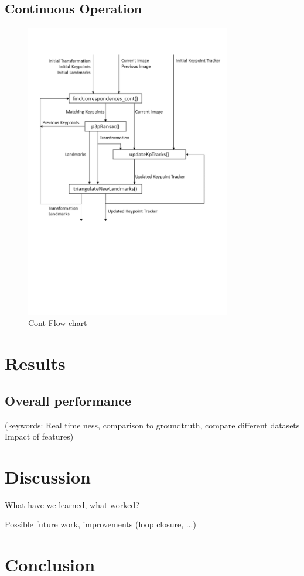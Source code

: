 \documentclass[a4paper,10pt]{article} %
\begin{document}
\subsection{Continuous Operation}
\label{sec_cont_op}


\begin{figure}[ht]
	\includegraphics[width=0.8\textwidth]{cont_chart}
	\caption{Cont Flow chart}
	\label{img_flow_cont}
\end{figure}


\newpage
\section{Results}

\subsection{Overall performance}
(keywords: Real time ness, comparison to groundtruth, compare different datasets
Impact of features)

\section{Discussion}
What have we learned, what worked?

Possible future work, improvements (loop closure, ...)

\section{Conclusion}


\newpage
%
\end{document}
